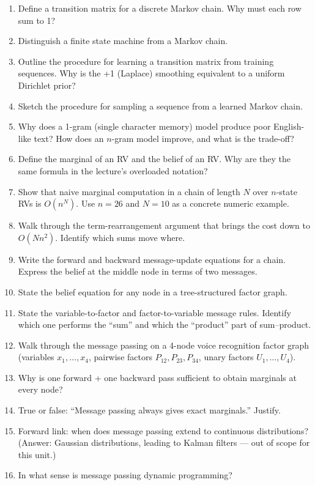 \documentclass[11pt, a4paper]{article}
\begin{document}
\begin{enumerate}
  \item Define a transition matrix for a discrete Markov chain. Why must each row sum to 1?
  \item Distinguish a finite state machine from a Markov chain.
  \item Outline the procedure for learning a transition matrix from training sequences. Why is the +1 (Laplace) smoothing equivalent to a uniform Dirichlet prior?
  \item Sketch the procedure for sampling a sequence from a learned Markov chain.
  \item Why does a 1-gram (single character memory) model produce poor English-like text? How does an $n$-gram model improve, and what is the trade-off?
  \item Define the marginal of an RV and the belief of an RV. Why are they the same formula in the lecture's overloaded notation?
  \item Show that naive marginal computation in a chain of length $N$ over $n$-state RVs is $O(n^N)$. Use $n=26$ and $N=10$ as a concrete numeric example.
  \item Walk through the term-rearrangement argument that brings the cost down to $O(Nn^2)$. Identify which sums move where.
  \item Write the forward and backward message-update equations for a chain. Express the belief at the middle node in terms of two messages.
  \item State the belief equation for any node in a tree-structured factor graph.
  \item State the variable-to-factor and factor-to-variable message rules. Identify which one performs the ``sum'' and which the ``product'' part of sum--product.
  \item Walk through the message passing on a 4-node voice recognition factor graph (variables $x_1, \ldots, x_4$, pairwise factors $P_{12}, P_{23}, P_{34}$, unary factors $U_1, \ldots, U_4$).
  \item Why is one forward + one backward pass sufficient to obtain marginals at every node?
  \item True or false: ``Message passing always gives exact marginals.'' Justify.
  \item Forward link: when does message passing extend to continuous distributions? (Answer: Gaussian distributions, leading to Kalman filters — out of scope for this unit.)
  \item In what sense is message passing dynamic programming?
\end{enumerate}
\end{document}

